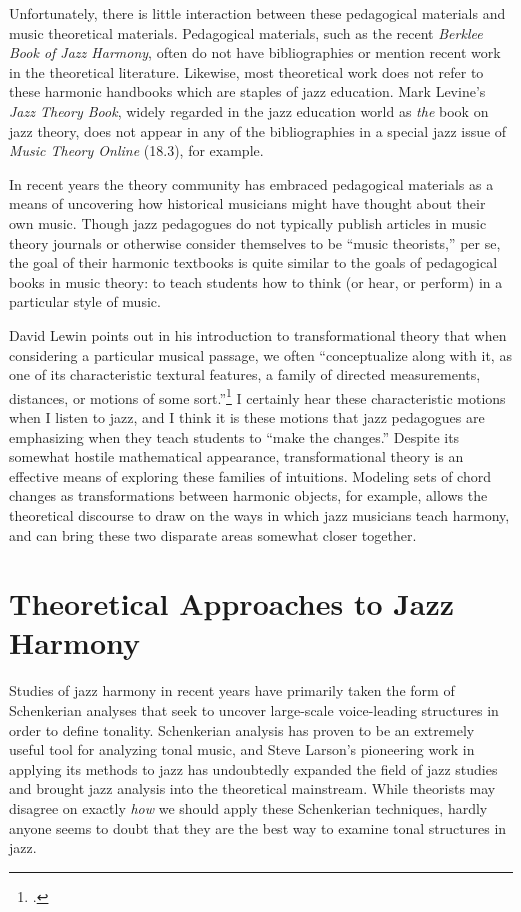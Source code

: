 Unfortunately, there is little interaction between these pedagogical materials
and music theoretical materials. Pedagogical materials, such as the recent
\emph{Berklee Book of Jazz Harmony}\nocite{berklee:harmony}, often do not have
bibliographies or mention recent work in the theoretical literature.
Likewise, most theoretical work does not refer to these harmonic handbooks
which are staples of jazz education. Mark Levine’s \emph{Jazz Theory
Book}\nocite{levine:1995}, widely regarded in the jazz education world as
\emph{the} book on jazz theory, does not appear in any of the bibliographies
in a special jazz issue of \emph{Music Theory Online} (18.3), for
example.

In recent years the theory community has embraced pedagogical materials as a
means of uncovering how historical musicians might have thought about their
own music. Though jazz pedagogues do not typically publish articles
in music theory journals or otherwise consider themselves to be “music
theorists,” per se, the goal of their harmonic textbooks is quite similar to
the goals of pedagogical books in music theory: to teach students how to think
(or hear, or perform) in a particular style of music.

David Lewin points out in his introduction to transformational theory that
when considering a particular musical passage, we often “conceptualize along
with it, as one of its characteristic textural features, a family of directed
measurements, distances, or motions of some sort.”\footcite[16]{lewin:gmit} I
certainly hear these characteristic motions when I listen to jazz, and I think
it is these motions that jazz pedagogues are emphasizing when they
teach students to “make the changes.” Despite its somewhat hostile
mathematical appearance, transformational theory is an effective means of
exploring these families of intuitions. Modeling sets of chord changes as
transformations between harmonic objects, for example, allows the theoretical
discourse to draw on the ways in which jazz musicians teach harmony, and can
bring these two disparate areas somewhat closer together.


\section{Theoretical Approaches to Jazz Harmony}
\label{sec:theoretical-approaches} %

Studies of jazz harmony in recent years have primarily taken the form of
Schenkerian analyses that seek to uncover large-scale voice-leading structures
in order to define tonality. Schenkerian analysis has proven to be an
extremely useful tool for analyzing tonal music, and Steve Larson’s pioneering
work in applying its methods to jazz has undoubtedly expanded the field of
jazz studies and brought jazz analysis into the theoretical mainstream. While
theorists may disagree on exactly \emph{how} we should apply these Schenkerian
techniques, hardly anyone seems to doubt that they are the best way to examine
tonal structures in jazz.

